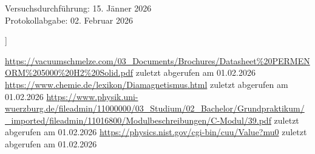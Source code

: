 \documentclass[a4paper,10pt,twocolumn]{scrartcl} %
\begin{document}
{\begin{abstract}
\end{abstract}
\vspace{1em}
\noindent Versuchsdurchführung: 15. Jänner 2026\\%
\noindent Protokollabgabe: 02. Februar 2026%
\vspace{1em}
}]



	







\begin{thebibliography}{}    %
	\url{https://vacuumschmelze.com/03_Documents/Brochures/Datasheet%20PERMENORM%205000%20H2%20Solid.pdf} zuletzt abgerufen am 01.02.2026
	\url{https://www.chemie.de/lexikon/Diamagnetismus.html} zuletzt abgerufen am 01.02.2026
	\url{https://www.physik.uni-wuerzburg.de/fileadmin/11000000/03_Studium/02_Bachelor/Grundpraktikum/_imported/fileadmin/11016800/Modulbeschreibungen/C-Modul/39.pdf} zuletzt abgerufen am 01.02.2026
\url{https://physics.nist.gov/cgi-bin/cuu/Value?mu0} zuletzt abgerufen am 01.02.2026
\end{thebibliography}



\end{document}
